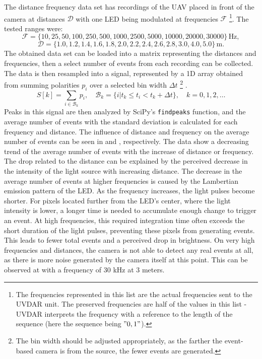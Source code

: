 The distance frequency data set has recordings of the \ac{UAV} placed in front of the camera at distances $\mathcal{D}$ with one \ac{LED} being modulated
at frequencies $\mathcal{F}$ \footnote{The frequencies represented in this list are the actual frequencies sent to the UVDAR unit. The preserved frequencies
are half of the values in this list - UVDAR interprets the frequency with a reference to the length of the sequence (here the sequence being $"0, 1"$).}.
The tested ranges were:
\[
\mathcal{F} = \{10, 25, 50, 100, 250, 500, 1000, 2500, 5000, 10000, 20000, 30000\} \, \text{Hz},
\]
\[
\mathcal{D} = \{1.0, 1.2, 1.4, 1.6, 1.8, 2.0, 2.2, 2.4, 2.6, 2.8, 3.0, 4.0, 5.0\} \, \text{m}.
\]
The obtained data set can be loaded into a matrix representing the distances and frequencies, then a select number of events from each recording
can be collected.
The data is then resampled into a signal, represented by a 1D array obtained from summing polarities $p_i$ over a selected bin width $\Delta t$
\footnote{The bin width should be adjusted appropriately, as the farther the event-based camera is from the source, the fewer events are generated.} .
\begin{equation}
    S[k] = \sum_{i\in\mathcal{B}_k}p_i, \quad \mathcal{B}_k=\{i|t_k\leq t_i<t_k+\Delta t\}, \quad k = 0, 1, 2, \ldots
    \label{eq:signal}
\end{equation}
Peaks in this signal are then analyzed by SciPy's \texttt{findpeaks} function,
and the average number of events with the standard deviation is calculated for each frequency and distance.
The influence of distance and frequency on the average number of events can be seen in  and , respectively. The data show a decreasing trend of the average number of events
with the increase of distance or frequency. The drop related to the distance can be explained by the perceived decrease in the intensity of the light source
with increasing distance. The decrease in the average number of events at higher frequencies is caused by the Lambertian emission pattern of the \ac{LED}. As the frequency increases, the light pulses become shorter. For pixels located further from the \ac{LED}'s center, where the light intensity is lower,
a longer time is needed to accumulate enough change to trigger an event. At high frequencies, this required integration time often exceeds the short
duration of the light pulses, preventing these pixels from generating events. This leads to fewer total events and a perceived drop in brightness. 
On very high frequencies and distances, the camera is not able
to detect any real events at all, as there is more noise generated by the camera itself at this point. This can be observed
at  with a frequency of $30$ kHz at $3$ meters.


